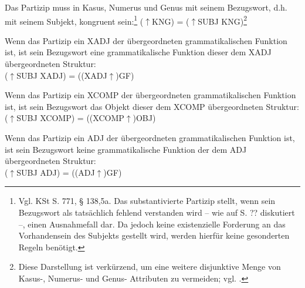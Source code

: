 \documentclass[12pt,a4paper]{article}
\begin{document}
Das Partizip muss in Kasus, Numerus und Genus mit seinem Bezugswort, d.h. mit seinem Subjekt, kongruent sein:\footnote{Vgl. KSt S. 771, § 138,5a. Das substantivierte Partizip stellt, wenn sein Bezugswort als tatsächlich fehlend verstanden wird -- wie auf S. ?? diskutiert --, einen Ausnahmefall dar. Da jedoch keine existenzielle Forderung an das Vorhandensein des Subjekts gestellt wird, werden hierfür keine gesonderten Regeln benötigt.} 
($\uparrow$KNG) = ($\uparrow$SUBJ KNG)\footnote{Diese Darstellung ist verkürzend, um eine weitere disjunktive Menge von Kasus-, Numerus- und Genus- Attributen zu vermeiden; vgl. \cite[49]{Skript}.}



Wenn das Partizip ein XADJ der übergeordneten grammatikalischen Funktion ist, ist sein Bezugswort eine grammatikalische Funktion dieser dem XADJ übergeordneten Struktur: \\
($\uparrow$SUBJ XADJ) = ((XADJ$\uparrow$)GF)

Wenn das Partizip ein XCOMP der übergeordneten grammatikalischen Funktion ist, ist sein Bezugswort das Objekt dieser dem XCOMP übergeordneten Struktur: \\
($\uparrow$SUBJ XCOMP) = ((XCOMP$\uparrow$)OBJ) 

Wenn das Partizip ein ADJ der übergeordneten grammatikalischen Funktion ist, ist sein Bezugswort keine grammatikalische Funktion der dem ADJ übergeordneten Struktur: \\
($\uparrow$SUBJ ADJ) = ((ADJ$\uparrow$)GF)
\end{document}
